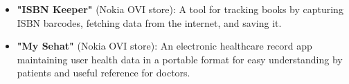 \documentclass[10pt,a4paper,ragged2e,withhyper]{altacv}
\begin{document}
\begin{paracol}{2}
\divider


\begin{itemize}
  \item \textbf{"ISBN Keeper"} (Nokia OVI store): A tool for tracking books by capturing ISBN barcodes, fetching data from the internet, and saving it.
  \item \textbf{"My Sehat"} (Nokia OVI store): An electronic healthcare record app maintaining user health data in a portable format for easy understanding by patients and useful reference for doctors.
\end{itemize}

\divider


\divider



\end{paracol}
\end{document}

